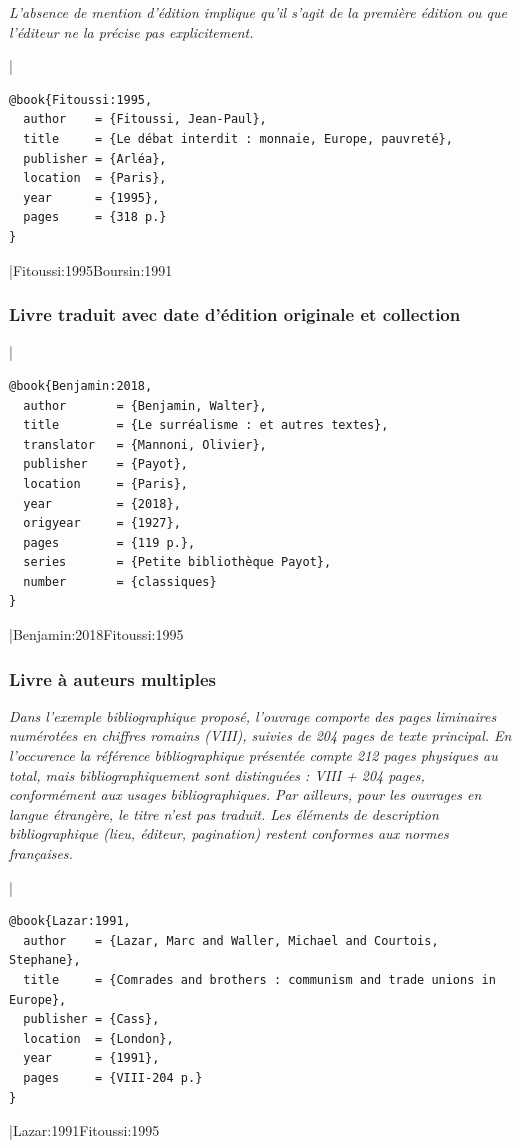 \documentclass{article}
\begin{document}
\emph{L'absence de mention d'édition implique qu'il s'agit de la première édition ou que l'éditeur ne la précise pas explicitement.}

|
\begin{verbatim}
@book{Fitoussi:1995,
  author    = {Fitoussi, Jean-Paul},
  title     = {Le débat interdit : monnaie, Europe, pauvreté},
  publisher = {Arléa},
  location  = {Paris},
  year      = {1995},
  pages     = {318 p.}
}
\end{verbatim}
|{Fitoussi:1995}{Boursin:1991}

\subsubsection{Livre traduit avec date d'édition originale et collection}

|
\begin{verbatim}
@book{Benjamin:2018,
  author       = {Benjamin, Walter},
  title        = {Le surréalisme : et autres textes},
  translator   = {Mannoni, Olivier},
  publisher    = {Payot},
  location     = {Paris},
  year         = {2018},
  origyear     = {1927},
  pages        = {119 p.},
  series       = {Petite bibliothèque Payot},
  number       = {classiques}
}
\end{verbatim}
|{Benjamin:2018}{Fitoussi:1995}

\subsubsection{Livre à auteurs multiples}

\emph{Dans l'exemple bibliographique proposé, l'ouvrage comporte des pages liminaires numérotées en chiffres romains (VIII), suivies de 204 pages de texte principal. En l'occurence la référence bibliographique présentée compte 212 pages physiques au total, mais bibliographiquement sont distinguées : VIII + 204 pages, conformément aux usages bibliographiques. Par ailleurs, pour les ouvrages en langue étrangère, le titre n'est pas traduit. Les éléments de description bibliographique (lieu, éditeur, pagination) restent conformes aux normes françaises.}

|
\begin{verbatim}
@book{Lazar:1991,
  author    = {Lazar, Marc and Waller, Michael and Courtois, Stephane},
  title     = {Comrades and brothers : communism and trade unions in Europe},
  publisher = {Cass},
  location  = {London},
  year      = {1991},
  pages     = {VIII-204 p.}
}
\end{verbatim}
|{Lazar:1991}{Fitoussi:1995}
\end{document}
